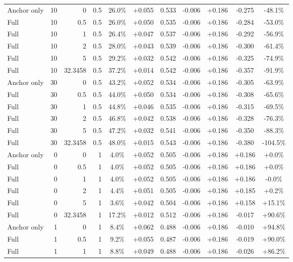 \begin{table}[htbp]
\begin{tabular}{lrrrccccccc}
Anchor only & 10 & 0 & 0.5 & 26.0\% & +0.055 & 0.533 & -0.006 & +0.186 & -0.275 & -48.1\% \\
Full & 10 & 0.5 & 0.5 & 26.0\% & +0.050 & 0.535 & -0.006 & +0.186 & -0.284 & -53.0\% \\
Full & 10 & 1 & 0.5 & 26.4\% & +0.047 & 0.537 & -0.006 & +0.186 & -0.292 & -56.9\% \\
Full & 10 & 2 & 0.5 & 28.0\% & +0.043 & 0.539 & -0.006 & +0.186 & -0.300 & -61.4\% \\
Full & 10 & 5 & 0.5 & 29.2\% & +0.032 & 0.542 & -0.006 & +0.186 & -0.325 & -74.9\% \\
Full & 10 & 32.3458 & 0.5 & 37.2\% & +0.014 & 0.542 & -0.006 & +0.186 & -0.357 & -91.9\% \\
Anchor only & 30 & 0 & 0.5 & 43.2\% & +0.052 & 0.534 & -0.006 & +0.186 & -0.305 & -63.9\% \\
Full & 30 & 0.5 & 0.5 & 44.0\% & +0.050 & 0.534 & -0.006 & +0.186 & -0.308 & -65.6\% \\
Full & 30 & 1 & 0.5 & 44.8\% & +0.046 & 0.535 & -0.006 & +0.186 & -0.315 & -69.5\% \\
Full & 30 & 2 & 0.5 & 46.8\% & +0.042 & 0.538 & -0.006 & +0.186 & -0.328 & -76.3\% \\
Full & 30 & 5 & 0.5 & 47.2\% & +0.032 & 0.541 & -0.006 & +0.186 & -0.350 & -88.3\% \\
Full & 30 & 32.3458 & 0.5 & 48.0\% & +0.015 & 0.543 & -0.006 & +0.186 & -0.380 & -104.5\% \\
Anchor only & 0 & 0 & 1 & 4.0\% & +0.052 & 0.505 & -0.006 & +0.186 & +0.186 & +0.0\% \\
Full & 0 & 0.5 & 1 & 4.0\% & +0.052 & 0.505 & -0.006 & +0.186 & +0.186 & +0.0\% \\
Full & 0 & 1 & 1 & 4.0\% & +0.052 & 0.505 & -0.006 & +0.186 & +0.186 & -0.0\% \\
Full & 0 & 2 & 1 & 4.4\% & +0.051 & 0.505 & -0.006 & +0.186 & +0.185 & +0.2\% \\
Full & 0 & 5 & 1 & 3.6\% & +0.042 & 0.504 & -0.006 & +0.186 & +0.158 & +15.1\% \\
Full & 0 & 32.3458 & 1 & 17.2\% & +0.012 & 0.512 & -0.006 & +0.186 & -0.017 & +90.6\% \\
Anchor only & 1 & 0 & 1 & 8.4\% & +0.062 & 0.488 & -0.006 & +0.186 & -0.010 & +94.8\% \\
Full & 1 & 0.5 & 1 & 9.2\% & +0.055 & 0.487 & -0.006 & +0.186 & -0.019 & +90.0\% \\
Full & 1 & 1 & 1 & 8.8\% & +0.049 & 0.488 & -0.006 & +0.186 & -0.026 & +86.2\% \\

\end{tabular}
\end{table}

